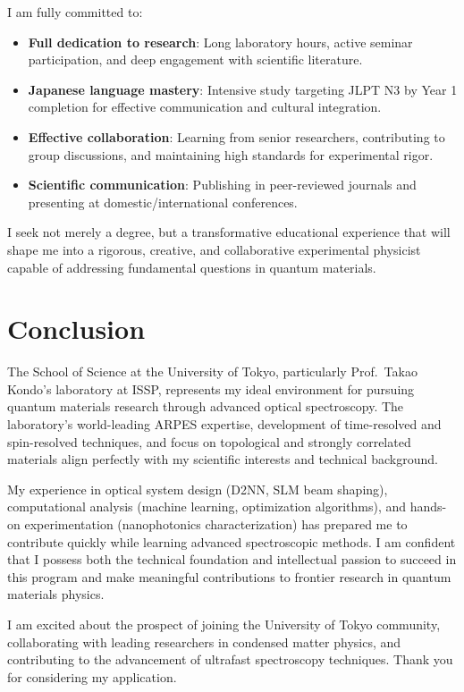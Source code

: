 \documentclass[11pt,a4paper]{article}
\begin{document}
I am fully committed to:
\begin{itemize}
    \item \textbf{Full dedication to research}: Long laboratory hours, active seminar participation, and deep engagement with scientific literature.
    \item \textbf{Japanese language mastery}: Intensive study targeting JLPT N3 by Year 1 completion for effective communication and cultural integration.
    \item \textbf{Effective collaboration}: Learning from senior researchers, contributing to group discussions, and maintaining high standards for experimental rigor.
    \item \textbf{Scientific communication}: Publishing in peer-reviewed journals and presenting at domestic/international conferences.
\end{itemize}

I seek not merely a degree, but a transformative educational experience that will shape me into a rigorous, creative, and collaborative experimental physicist capable of addressing fundamental questions in quantum materials.

\section{Conclusion}

The School of Science at the University of Tokyo, particularly Prof.~Takao Kondo's laboratory at ISSP, represents my ideal environment for pursuing quantum materials research through advanced optical spectroscopy. The laboratory's world-leading ARPES expertise, development of time-resolved and spin-resolved techniques, and focus on topological and strongly correlated materials align perfectly with my scientific interests and technical background.

My experience in optical system design (D2NN, SLM beam shaping), computational analysis (machine learning, optimization algorithms), and hands-on experimentation (nanophotonics characterization) has prepared me to contribute quickly while learning advanced spectroscopic methods. I am confident that I possess both the technical foundation and intellectual passion to succeed in this program and make meaningful contributions to frontier research in quantum materials physics.

I am excited about the prospect of joining the University of Tokyo community, collaborating with leading researchers in condensed matter physics, and contributing to the advancement of ultrafast spectroscopy techniques. Thank you for considering my application.
\end{document}
